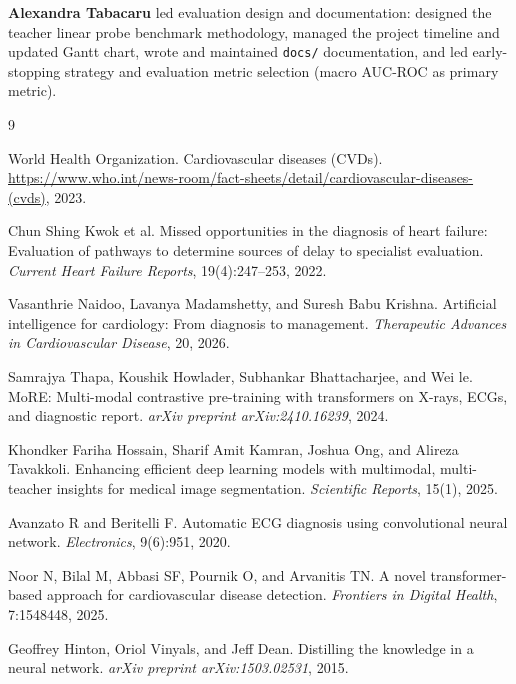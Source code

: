 \documentclass[sigconf,nonacm]{acmart}
\begin{document}
\textbf{Alexandra Tabacaru} led evaluation design and documentation:
designed the teacher linear probe benchmark methodology, managed the
project timeline and updated Gantt chart, wrote and maintained
\texttt{docs/} documentation, and led early-stopping strategy and
evaluation metric selection (macro AUC-ROC as primary metric).


\begin{thebibliography}{9}

World Health Organization.
\newblock Cardiovascular diseases (CVDs).
\newblock \url{https://www.who.int/news-room/fact-sheets/detail/cardiovascular-diseases-(cvds)}, 2023.

Chun Shing Kwok et al.
\newblock Missed opportunities in the diagnosis of heart failure: Evaluation of pathways to determine sources of delay to specialist evaluation.
\newblock \textit{Current Heart Failure Reports}, 19(4):247–253, 2022.

Vasanthrie Naidoo, Lavanya Madamshetty, and Suresh Babu Krishna.
\newblock Artificial intelligence for cardiology: From diagnosis to management.
\newblock \textit{Therapeutic Advances in Cardiovascular Disease}, 20, 2026.

Samrajya Thapa, Koushik Howlader, Subhankar Bhattacharjee, and Wei le.
\newblock MoRE: Multi-modal contrastive pre-training with transformers on X-rays, ECGs, and diagnostic report.
\newblock \textit{arXiv preprint arXiv:2410.16239}, 2024.

Khondker Fariha Hossain, Sharif Amit Kamran, Joshua Ong, and Alireza Tavakkoli.
\newblock Enhancing efficient deep learning models with multimodal, multi-teacher insights for medical image segmentation.
\newblock \textit{Scientific Reports}, 15(1), 2025.

Avanzato R and Beritelli F.
\newblock Automatic ECG diagnosis using convolutional neural network.
\newblock \textit{Electronics}, 9(6):951, 2020.

Noor N, Bilal M, Abbasi SF, Pournik O, and Arvanitis TN.
\newblock A novel transformer-based approach for cardiovascular disease detection.
\newblock \textit{Frontiers in Digital Health}, 7:1548448, 2025.

Geoffrey Hinton, Oriol Vinyals, and Jeff Dean.
\newblock Distilling the knowledge in a neural network.
\newblock \textit{arXiv preprint arXiv:1503.02531}, 2015.

\end{thebibliography}
\end{document}
